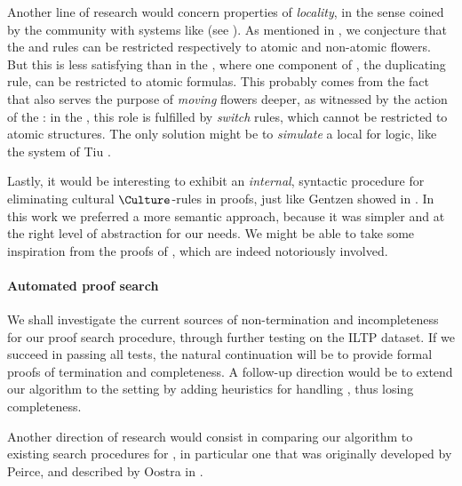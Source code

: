 \begin{scope}
Another line of research would concern properties of \emph{locality}, in the
sense coined by the  community with systems like  (see
). As mentioned in , we
conjecture that the  and  rules can be restricted
respectively to atomic and non-atomic flowers. But this is less satisfying than
in the , where one component of , the
duplicating \emph{} rule, can be restricted to atomic formulas. This
probably comes from the fact that  also serves the purpose of
\emph{moving} flowers deeper, as witnessed by the   action of
the : in the , this role is fulfilled by
\emph{switch} rules, which cannot be restricted to atomic structures. The only
solution might be to \emph{simulate} a local  for
 logic, like the system  of Tiu
.

Lastly, it would be interesting to exhibit an \emph{internal}, syntactic
procedure for eliminating cultural $\Culture$-rules in proofs, just like Gentzen
showed  in . In this work we preferred a more
semantic approach, because it was simpler and at the right level of abstraction
for our needs. We might be able to take some inspiration from the
 proofs of , which are indeed notoriously
involved.

\paragraph{Automated proof search}

We shall investigate the current sources of non-termination and incompleteness
for our  proof search procedure, through further testing on the
ILTP dataset. If we succeed in passing all tests, the natural continuation will
be to provide formal proofs of termination and completeness. A follow-up
direction would be to extend our algorithm to the  setting by adding
heuristics for handling , thus losing completeness.

Another direction of research would consist in comparing our algorithm to
existing search procedures for , in particular one that was originally
developed by Peirce, and described by Oostra in .


\end{scope}
